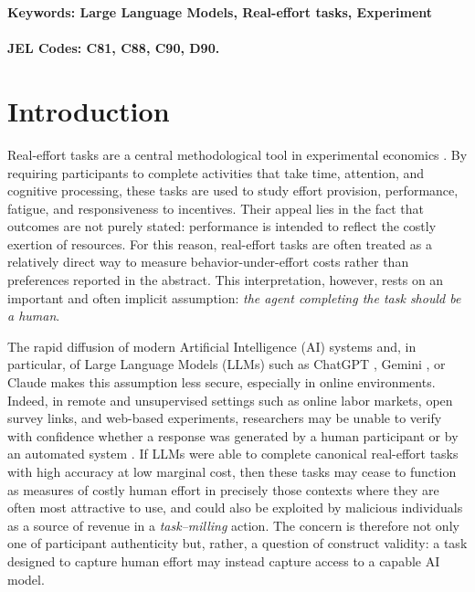 \documentclass[12pt,a4paper]{article}
\newcommand{\SC}[1]{\textcolor{violet}{SC: #1}}
\begin{document}
\noindent\textbf{Keywords: Large Language Models, Real-effort tasks, Experiment}
\\
\\
\noindent\textbf{JEL Codes:  C81, C88, C90, D90.}

\newpage
\section{Introduction}

Real-effort tasks are a central methodological tool in experimental economics \citep{charness2018experimental, carpenter201919}. By requiring participants to complete activities that take time, attention, and cognitive processing, these tasks are used to study effort provision, performance, fatigue, and responsiveness to incentives. Their appeal lies in the fact that outcomes are not purely stated:
performance is intended to reflect the costly exertion of resources. For this reason, real-effort tasks are often treated as a relatively direct way to measure behavior-under-effort costs rather than preferences reported in the abstract. This interpretation, however, rests on an important and often implicit assumption: {\em the agent completing the task should be a human}. 

The rapid diffusion of modern Artificial Intelligence (AI) systems and, in particular, of Large Language Models (LLMs) such as
ChatGPT \citep{openai2022chatgpt}, Gemini \citep{pichai2023gemini,team2023gemini}, or Claude \citep{anthropic2023claude} makes this assumption less secure, especially in online environments. Indeed, in remote and unsupervised settings such as online labor markets, open survey links, and web-based experiments, researchers may be unable to verify with confidence whether a response was generated by a human participant or by an automated system \citep{bevendorff2025detection}. If LLMs were able to complete canonical real-effort tasks with high accuracy at low marginal cost, then these tasks may cease to function as measures of costly human effort in precisely those contexts where they are often most attractive to use, and could also be exploited by malicious individuals as a source of revenue in a {\em task--milling} action. The concern is therefore not only one of participant authenticity but, rather, a question of construct validity: a task designed to capture human effort may instead capture access to a capable AI model.
\end{document}
